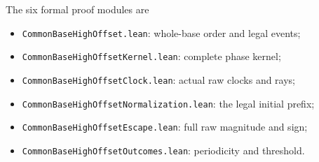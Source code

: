 \documentclass[11pt,letterpaper]{article}
\begin{document}
The six formal proof modules are
\begin{itemize}
\item \texttt{CommonBaseHighOffset.lean}: whole-base order and legal events;
\item \texttt{CommonBaseHighOffsetKernel.lean}: complete phase kernel;
\item \texttt{CommonBaseHighOffsetClock.lean}: actual raw clocks and rays;
\item \texttt{CommonBaseHighOffsetNormalization.lean}: the legal initial prefix;
\item \texttt{CommonBaseHighOffsetEscape.lean}: full raw magnitude and sign;
\item \texttt{CommonBaseHighOffsetOutcomes.lean}: periodicity and threshold.
\end{itemize}



\end{document}
